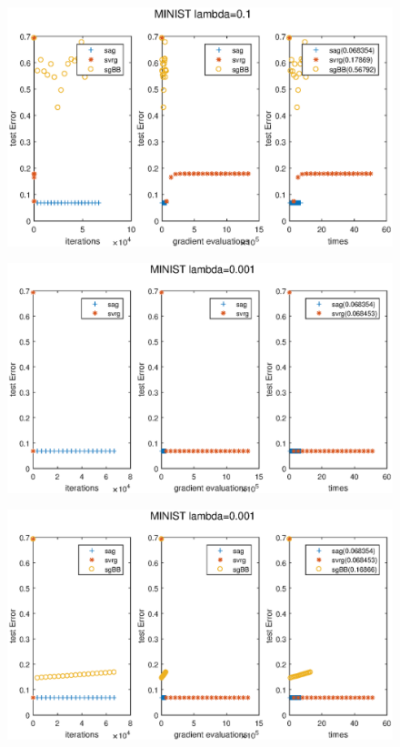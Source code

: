 \documentclass[UTF8]{ctexart}
\begin{document}
\begin{figure}[htbp]
\centering\includegraphics[width=5in]{1-01-b.eps}
\label{fig:1-0.1-b}
\end{figure}
\begin{figure}[htbp]
\centering\includegraphics[width=5in]{1-0001-a.eps}
\label{fig:1-0.001-a}
\end{figure}
\begin{figure}[htbp]
\centering\includegraphics[width=5in]{1-0001-b.eps}
\label{fig:1-0.001-b}
\end{figure}
\end{document}
